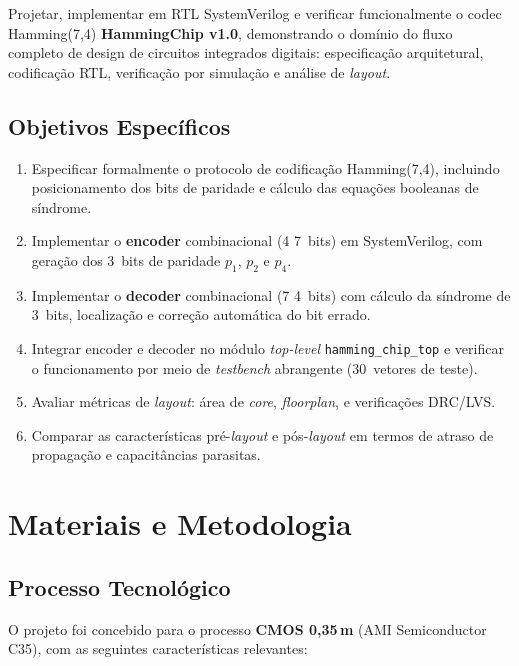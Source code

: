 \documentclass[12pt,a4paper]{article}
\begin{document}
Projetar, implementar em RTL SystemVerilog e verificar funcionalmente o codec Hamming(7,4) \textbf{HammingChip v1.0}, demonstrando o domínio do fluxo completo de design de circuitos integrados digitais: especificação arquitetural, codificação RTL, verificação por simulação e análise de \textit{layout}.

\subsection{Objetivos Específicos}

\begin{enumerate}[leftmargin=2em,label=\textbf{O\arabic*.}]
  \item Especificar formalmente o protocolo de codificação Hamming(7,4), incluindo posicionamento dos bits de paridade e cálculo das equações booleanas de síndrome.
  \item Implementar o \textbf{encoder} combinacional (4\,\textrightarrow\,7~bits) em SystemVerilog, com geração dos 3~bits de paridade $p_1$, $p_2$ e $p_4$.
  \item Implementar o \textbf{decoder} combinacional (7\,\textrightarrow\,4~bits) com cálculo da síndrome de 3~bits, localização e correção automática do bit errado.
  \item Integrar encoder e decoder no módulo \textit{top-level} \texttt{hamming\_chip\_top} e verificar o funcionamento por meio de \textit{testbench} abrangente (30~vetores de teste).
  \item Avaliar métricas de \textit{layout}: área de \textit{core}, \textit{floorplan}, e verificações DRC/LVS.
  \item Comparar as características pré-\textit{layout} e pós-\textit{layout} em termos de atraso de propagação e capacitâncias parasitas.
\end{enumerate}

\section{Materiais e Metodologia}

\subsection{Processo Tecnológico}

O projeto foi concebido para o processo \textbf{CMOS 0,35\,\textmu m} (AMI Semiconductor C35), com as seguintes características relevantes:
\end{document}

